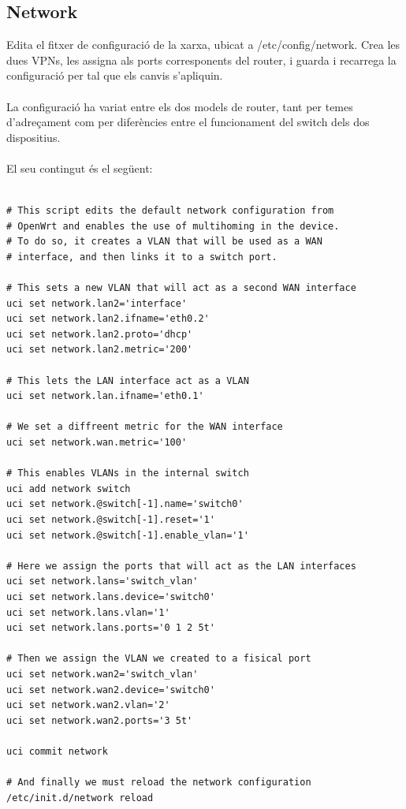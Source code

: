 \documentclass[11pt]{article}
\begin{document}
\subsection{Network}
Edita el fitxer de configuració de la xarxa, ubicat a /etc/config/network. Crea les dues VPNs, les assigna als ports corresponents del router, i guarda i recarrega la configuració per tal que els canvis s’apliquin.\\
\\
La configuració ha variat entre els dos models de router, tant per temes d'adreçament com per diferències entre el funcionament del switch dels dos dispositius.\\
\\
El seu contingut és el següent:\\
\begin{lstlisting}[frame=single]

# This script edits the default network configuration from 
# OpenWrt and enables the use of multihoming in the device.
# To do so, it creates a VLAN that will be used as a WAN 
# interface, and then links it to a switch port.

# This sets a new VLAN that will act as a second WAN interface
uci set network.lan2='interface'
uci set network.lan2.ifname='eth0.2'
uci set network.lan2.proto='dhcp'
uci set network.lan2.metric='200'

# This lets the LAN interface act as a VLAN
uci set network.lan.ifname='eth0.1'

# We set a diffreent metric for the WAN interface
uci set network.wan.metric='100'

# This enables VLANs in the internal switch
uci add network switch
uci set network.@switch[-1].name='switch0'
uci set network.@switch[-1].reset='1'
uci set network.@switch[-1].enable_vlan='1'

# Here we assign the ports that will act as the LAN interfaces
uci set network.lans='switch_vlan'
uci set network.lans.device='switch0'
uci set network.lans.vlan='1'
uci set network.lans.ports='0 1 2 5t'

# Then we assign the VLAN we created to a fisical port
uci set network.wan2='switch_vlan'
uci set network.wan2.device='switch0'
uci set network.wan2.vlan='2'
uci set network.wan2.ports='3 5t'

uci commit network

# And finally we must reload the network configuration
/etc/init.d/network reload
\end{lstlisting}
\end{document}
